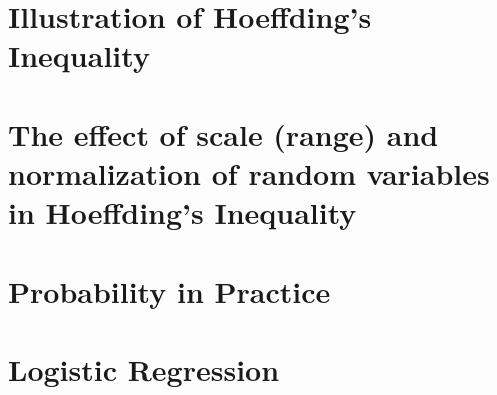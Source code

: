 \documentclass[10pt]{article}
\begin{document}
\section{Illustration of Hoeffding's Inequality}



\section{The effect of scale (range) and normalization of random variables in Hoeffding's Inequality}



\section{Probability in Practice}



\section{Logistic Regression}


\end{document}
